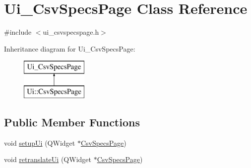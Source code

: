 \hypertarget{class_ui___csv_specs_page}{}\section{Ui\+\_\+\+Csv\+Specs\+Page Class Reference}
\label{class_ui___csv_specs_page}


{\ttfamily \#include $<$ui\+\_\+csvspecspage.\+h$>$}

Inheritance diagram for Ui\+\_\+\+Csv\+Specs\+Page\+:\begin{figure}[H]
\begin{center}
\leavevmode
\includegraphics[height=2.000000cm]{dd/dac/class_ui___csv_specs_page}
\end{center}
\end{figure}
\subsection*{Public Member Functions}
\begin{DoxyCompactItemize}
\item 
void \mbox{\hyperlink{class_ui___csv_specs_page_aa368def8273a141c57f549704d9a1444}{setup\+Ui}} (Q\+Widget $\ast$\mbox{\hyperlink{class_csv_specs_page}{Csv\+Specs\+Page}})
\item 
void \mbox{\hyperlink{class_ui___csv_specs_page_afcc295c32a143233c82512fb29f1b1bc}{retranslate\+Ui}} (Q\+Widget $\ast$\mbox{\hyperlink{class_csv_specs_page}{Csv\+Specs\+Page}})
\end{DoxyCompactItemize}
